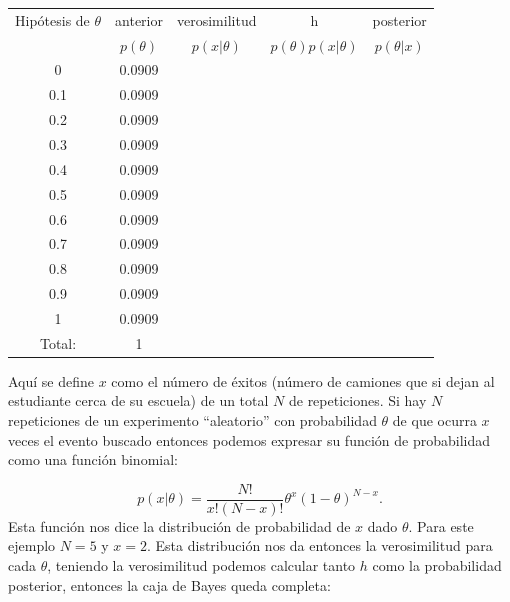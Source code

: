 \documentclass{article}
\begin{document}
\begin{center}
\begin{tabular}{ |c|c|c|c|c| } 
\hline
Hip\'otesis de $\theta$ & anterior & verosimilitud &  h  & posterior \\
 & $p(\theta)$ & $p(x\vert \theta)$ & $p(\theta)p(x\vert \theta)$ & $p(\theta\vert x)$ \\
\hline
0   & 0.0909 &  &  &  \\
0.1 & 0.0909 &  &  &  \\
0.2 & 0.0909 &  &  &  \\
0.3 & 0.0909 &  &  &  \\
0.4 & 0.0909 &  &  &  \\
0.5 & 0.0909 &  &  &  \\
0.6 & 0.0909 &  &  &  \\
0.7 & 0.0909 &  &  &  \\
0.8 & 0.0909 &  &  &  \\
0.9 & 0.0909 &  &  &  \\
1   & 0.0909 &  &  &  \\
\hline
Total: & 1 &  &  &  \\
\hline
\end{tabular}
\end{center}
Aqu\'i se define $x$ como el n\'umero de \'exitos (n\'umero de camiones que si dejan al estudiante cerca de su escuela) de un total $N$ de repeticiones. Si hay $N$ repeticiones de un experimento ``aleatorio'' con probabilidad $\theta$ de que ocurra $x$ veces el evento buscado entonces podemos expresar su funci\'on de probabilidad como una funci\'on binomial:

\begin{equation}
p(x\vert \theta) = \frac{N!}{x!(N-x)!} \theta^x (1-\theta)^{N-x}.
\end{equation}
Esta funci\'on nos dice la distribuci\'on de probabilidad de $x$ dado $\theta$. Para este ejemplo $N=5$ y $x=2$. Esta distribuci\'on nos da entonces la verosimilitud para cada $\theta$, teniendo la verosimilitud podemos calcular tanto $h$ como la probabilidad posterior, entonces la caja de Bayes queda completa:
\end{document}
